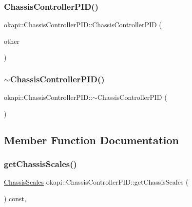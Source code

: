\subsubsection{\texorpdfstring{ChassisControllerPID()}{ChassisControllerPID()}\hspace{0.1cm}{\footnotesize\ttfamily [3/3]}}
{\footnotesize\ttfamily okapi\+::\+Chassis\+Controller\+P\+I\+D\+::\+Chassis\+Controller\+P\+ID (\begin{DoxyParamCaption}\item[{\mbox{\hyperlink{classokapi_1_1ChassisControllerPID}{Chassis\+Controller\+P\+ID}} \&\&}]{other }\end{DoxyParamCaption})\hspace{0.3cm}{\ttfamily [delete]}}

\mbox{\label{classokapi_1_1ChassisControllerPID_a89f64eec355595eaa2631305805efdb5}} 
\subsubsection{\texorpdfstring{$\sim$ChassisControllerPID()}{~ChassisControllerPID()}}
{\footnotesize\ttfamily okapi\+::\+Chassis\+Controller\+P\+I\+D\+::$\sim$\+Chassis\+Controller\+P\+ID (\begin{DoxyParamCaption}{ }\end{DoxyParamCaption})\hspace{0.3cm}{\ttfamily [override]}}



\subsection{Member Function Documentation}
\mbox{\label{classokapi_1_1ChassisControllerPID_a75f4e1b26f2440ac4066fd740dee7b13}} 
\subsubsection{\texorpdfstring{getChassisScales()}{getChassisScales()}}
{\footnotesize\ttfamily \mbox{\hyperlink{classokapi_1_1ChassisScales}{Chassis\+Scales}} okapi\+::\+Chassis\+Controller\+P\+I\+D\+::get\+Chassis\+Scales (\begin{DoxyParamCaption}{ }\end{DoxyParamCaption}) const\hspace{0.3cm}{\ttfamily [override]}, {\ttfamily [virtual]}}

